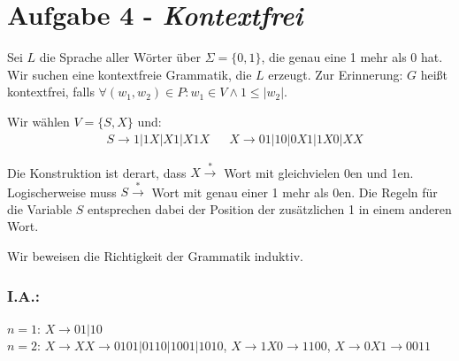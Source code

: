 \documentclass{article}
\begin{document}
\section*{Aufgabe 4 - \textit{Kontextfrei}}

Sei $L$ die Sprache aller Wörter über $\Sigma = \{0,1\}$, die genau eine 1 mehr als 0 hat. Wir suchen eine kontextfreie Grammatik, die $L$ erzeugt. Zur Erinnerung: $G$ heißt kontextfrei, falls $\forall (w_1,w_2) \in P: w_1 \in V \land 1 \le |w_2|$.

Wir wählen $V = \{S,X\}$ und:
\begin{align}
	& S \to 1 | 1X | X1 | X1X && X \to 01 | 10 | 0X1 | 1X0 | XX
\end{align}

Die Konstruktion ist derart, dass $X \overset{*}{\to}$ Wort mit gleichvielen 0en und 1en. Logischerweise muss $S \overset{*}{\to}$ Wort mit genau einer 1 mehr als 0en. Die Regeln für die Variable $S$ entsprechen dabei der Position der zusätzlichen 1 in einem anderen Wort.

Wir beweisen die Richtigkeit der Grammatik induktiv.

\subsubsection*{I.A.:}

$n=1$: $X \to 01 | 10$\\
$n=2$: $X \to XX \to 0101 | 0110 | 1001 | 1010$, $X \to 1X0 \to 1100$, $X \to 0X1 \to 0011$
\end{document}
